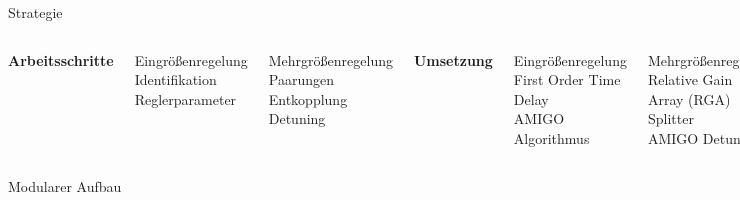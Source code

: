 \documentclass[fleqn,11pt,aspectratio=43]{beamer}
\begin{document}

\begin{frame}{Strategie}

\begin{columns}[onlytextwidth]
\textbf{Arbeitsschritte}\\
\begin{alertblock}{Eingrößenregelung}
Identifikation \\
Reglerparameter
\end{alertblock}


\begin{alertblock}{Mehrgrößenregelung}
Paarungen \\
Entkopplung \\
Detuning
\end{alertblock}

\textbf{Umsetzung}\\
\begin{exampleblock}{Eingrößenregelung}
First Order Time Delay \\
AMIGO Algorithmus
\end{exampleblock}

\begin{exampleblock}{Mehrgrößenregelung}
Relative Gain Array (RGA)\\
Splitter \\
AMIGO Detuning
\end{exampleblock}

\end{columns}
\begin{center}
Modularer Aufbau
\end{center}
\end{frame}
\end{document}

